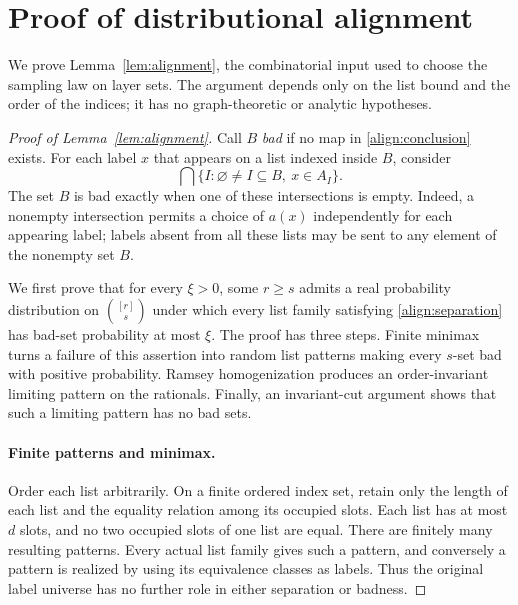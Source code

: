\section{Proof of distributional alignment}
\label{sec:alignment-proof}

We prove Lemma~\ref{lem:alignment}, the combinatorial input used to
choose the sampling law on layer sets. The argument depends only on
the list bound and the order of the indices; it has no graph-theoretic
or analytic hypotheses.

\begin{proof}[Proof of Lemma~\ref{lem:alignment}]
Call $B$ \emph{bad} if no map in \eqref{align:conclusion} exists.  For each
label $x$ that appears on a list indexed inside $B$, consider
\[
 \bigcap\{I:\varnothing\ne I\subseteq B,\ x\in A_I\}.
\]
The set $B$ is bad exactly when one of these intersections is empty.
Indeed, a nonempty intersection permits a choice of $a(x)$ independently
for each appearing label; labels absent from all these lists may be sent to
any element of the nonempty set $B$.

We first prove that for every $\xi>0$, some $r\geq s$ admits a real
probability distribution on $\binom{[r]}s$ under which every list family
satisfying \eqref{align:separation} has bad-set probability at most $\xi$.
The proof has three steps.  Finite minimax turns a failure of this assertion
into random list patterns making every $s$-set bad with positive
probability.  Ramsey homogenization produces an order-invariant limiting
pattern on the rationals.  Finally, an invariant-cut argument shows that
such a limiting pattern has no bad sets.

\paragraph{Finite patterns and minimax.}
Order each list arbitrarily.  On a finite ordered index set, retain only
the length of each list and the equality relation among its occupied
slots.  Each list has at most $d$ slots, and no two occupied slots of one
list are equal.  There are finitely many resulting patterns.  Every actual
list family gives such a pattern, and conversely a pattern is realized by
using its equivalence classes as labels.  Thus the original label universe
has no further role in either separation or badness.


\end{proof}
